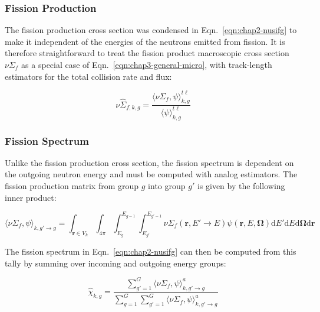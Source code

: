 \subsubsection{Fission Production}
\label{subsubsec:chap3-tally-types-fiss-prod}

The fission production cross section was condensed in Eqn.~\ref{eqn:chap2-nusifg} to make it independent of the energies of the neutrons emitted from fission. It is therefore straightforward to treat the fission product macroscopic cross section $\nu\Sigma_{f}$ as a special case of Eqn.~\ref{eqn:chap3-general-micro}, with track-length estimators for the total collision rate and flux:

\begin{equation}
\label{eqn:chap3-nu-fiss-macro}
\nu\hat{\Sigma}_{f,k,g} = \frac{\langle \nu\Sigma_{f}, \psi \rangle_{k,g}^{t\ell}}{\langle \psi \rangle_{k,g}^{t\ell}}
\end{equation}


\subsubsection{Fission Spectrum}
\label{subsubsec:chap3-tally-types-chi}

Unlike the fission production cross section, the fission spectrum is dependent on the outgoing neutron energy and must be computed with analog estimators. The fission production matrix from group $g$ into group $g'$ is given by the following inner product:

\begin{equation}
\label{eqn:chap3-nu-fiss-energies}
\langle \nu\Sigma_{f}, \psi \rangle_{k,g'\rightarrow g} = \int_{\mathbf{r} \in V_{k}} \int_{4\pi} \int_{E_{g}}^{E_{g-1}} \int_{E_{g'}}^{E_{g'-1}} \nu\Sigma_{f}(\mathbf{r},E'\rightarrow E)\psi(\mathbf{r},E,\mathbf{\Omega}) \mathrm{d}E'\mathrm{d}E\mathrm{d}\mathbf{\Omega}\mathrm{d}\mathbf{r}
\end{equation}

\noindent The fission spectrum in Eqn.~\ref{eqn:chap2-nusifg} can then be computed from this tally by summing over incoming and outgoing energy groups:

\begin{equation}
\label{eqn:chap3-nu-fiss-macro}
\hat{\chi}_{k,g} = \frac{\displaystyle\sum\limits_{g'=1}^{G} \langle \nu\Sigma_{f}, \psi \rangle_{k,g'\rightarrow g}^{a}}{\displaystyle\sum\limits_{g=1}^{G} \displaystyle\sum\limits_{g'=1}^{G} \langle \nu\Sigma_{f}, \psi \rangle_{k,g'\rightarrow g}^{a}}
\end{equation}

